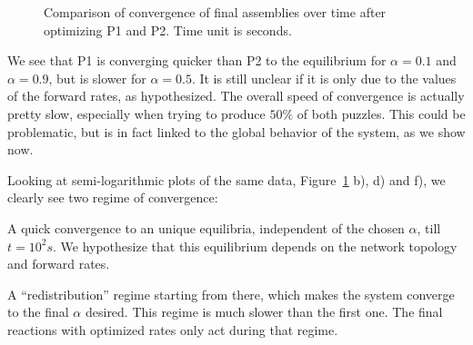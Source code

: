 \begin{figure}[h!]
{				\label{fig:optim_objfct_comparison:alpha05_log}
		 	}
			\caption{Comparison of convergence of final assemblies over time after optimizing P1 and P2. Time unit is seconds.}
		\label{fig:optim_objfct_comparison} %
		\end{figure}
		
		
		We see that P1 is converging quicker than P2 to the equilibrium for $\alpha=0.1$ and $\alpha=0.9$, but is slower for $\alpha=0.5$. It is still unclear if it is only due to the values of the forward rates, as hypothesized. The overall speed of convergence is actually pretty slow, especially when trying to produce $50\%$ of both puzzles. This could be problematic, but is in fact linked to the global behavior of the system, as we show now.
	
		Looking at semi-logarithmic plots of the same data, Figure~\ref{fig:optim_objfct_comparison} b), d) and f), we clearly see two regime of convergence:
	
		\begin{my_itemize}
			\item A quick convergence to an unique equilibria, independent of the chosen $\alpha$, till $t=10^2 s$. We hypothesize that this equilibrium depends on the network topology and forward rates.
			\item A ``redistribution'' regime starting from there, which makes the system converge to the final $\alpha$ desired. This regime is much slower than the first one. The final reactions with optimized rates only act during that regime.
		\end{my_itemize}
	
